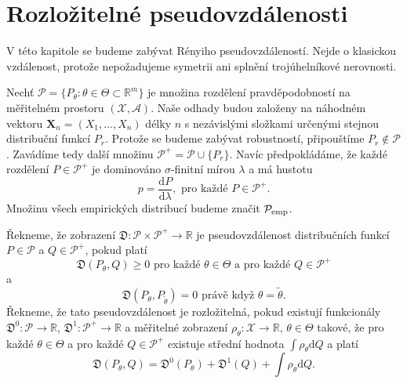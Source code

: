 \chapter{Rozložitelné pseudovzdálenosti}

V této kapitole se budeme zabývat Rényiho pseudovzdáleností. Nejde o klasickou vzdálenost, protože nepožadujeme symetrii ani splnění trojúhelníkové nerovnosti. 

Nech\v{t} $\mathcal{P} = \lbrace P_\theta : \theta \in \Theta \subset \mathbb{R}^m \rbrace$ je množina rozdělení pravděpodobností na měřitelném prostoru $\left(\mathcal{X},\mathcal{A}\right)$.
Naše odhady budou založeny na náhodném vektoru $\mathbf{X}_n = (X_1, \ldots ,X_n)$ délky $n$ s nezávislými složkami určenými stejnou distribuční funkcí $P_{r}$. Protože se budeme zabývat robustností, připouštíme $P_r \notin \mathcal{P}$. Zavádíme tedy další množinu $\mathcal{P}^+ = \mathcal{P} \cup \lbrace P_r \rbrace$. Navíc předpokládáme, že každé rozdělení $P \in \mathcal{P}^+$ je dominováno $\sigma$-finitní mírou $\lambda$ a má hustotu 
\begin{equation}
p = \dfrac{\mathrm{d}P}{\mathrm{d}\lambda}, \text{ pro každé } P \in \mathcal{P}^+.
\end{equation}
Množinu všech empirických distribucí budeme značit $\mathcal{P}_\mathrm{emp}$.

\begin{definition}
	Řekneme, že zobrazení $\mathfrak{D}:\mathcal{P}\times\mathcal{P}^+ \rightarrow \mathbb{R}$ je pseudovzdálenost distribučních funkcí $P \in \mathcal{P}$ a $Q \in \mathcal{P}^+$, pokud platí		
		\begin{equation}
			\mathfrak{D}(P_\theta,Q) \geq 0 \text{ pro každé } \theta \in \Theta \text{ a pro každé } Q \in \mathcal{P}^+
		\end{equation}
		a	
		\begin{equation}
			\mathfrak{D}(P_\theta,P_{\tilde{\theta}})=0 \text{ právě když } \theta=\tilde{\theta}.
		\end{equation}	
	Řekneme, že tato pseudovzdálenost je rozložitelná, pokud existují funkcionály 
		 $\mathfrak{D}^0:\mathcal{P}\rightarrow\mathbb{R}$, $ \mathfrak{D}^1:\mathcal{P}^+ \rightarrow \mathbb{R}$ a měřitelné zobrazení 
		  $\rho_\theta : \mathcal{X} \rightarrow \mathbb{R}$, $ \theta \in \Theta$ takové, že pro každé $\theta \in \Theta$ a pro každé $Q \in \mathcal{P}^+$ existuje střední hodnota $\int{\rho_\theta }\mathrm{d}Q$ a platí
		\begin{equation}
			\mathfrak{D} (P_\theta, Q) = \mathfrak{D}^0 (P_\theta) + \mathfrak{D}^1 (Q) + \int \rho_\theta \mathrm{d}Q.
		\end{equation}
\end{definition}

